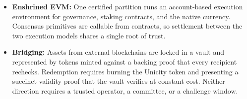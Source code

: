 \documentclass{article}
\begin{document}
\begin{itemize}
    \item \textbf{Enshrined EVM:}
    One certified partition runs an account-based execution environment for governance, staking contracts, and the native currency. Consensus primitives are callable from contracts, so settlement between the two execution models shares a single root of trust.

    \item \textbf{Bridging:}
    Assets from external blockchains are locked in a vault and represented by tokens minted against a backing proof that every recipient rechecks. Redemption requires burning the Unicity token and presenting a succinct validity proof that the vault verifies at constant cost. Neither direction requires a trusted operator, a committee, or a challenge window.
\end{itemize}

\clearpage
\setlength{\cftbeforesecskip}{3pt}
\tableofcontents
\clearpage



\newpage


\newpage


\newpage


%

%

\newpage

\end{document}
